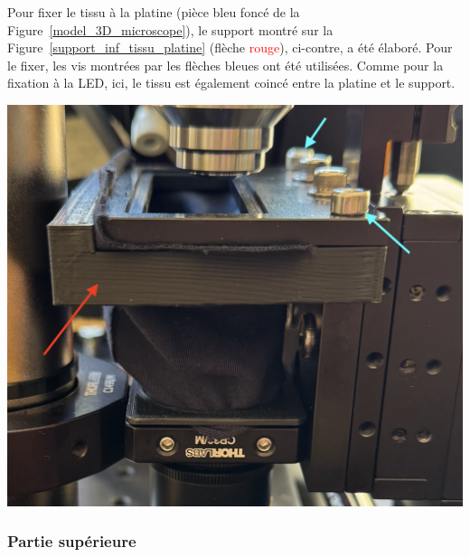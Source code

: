 \begin{minipage}[c]{0.38\textwidth}
    Pour fixer le tissu à la platine (pièce \textcolor[RGB]{30, 50, 150}{bleu foncé} de la Figure~\ref{model_3D_microscope}), le support montré sur la Figure~\ref{support_inf_tissu_platine} (flèche \textcolor{red}{rouge}), ci-contre, a été élaboré. Pour le fixer, les vis montrées par les flèches \textcolor[RGB]{115, 210, 210}{bleues} ont été utilisées. Comme pour la fixation à la LED, ici, le tissu est également coincé entre la platine et le support.
\end{minipage}\hfill
\begin{minipage}[c]{0.58\textwidth}
    \begin{center}
        \includegraphics[width=\textwidth]{assets/figures/Protections_laser/Securite_mecanique/Protection_vers_microscope/support_inf_tissu_platine.jpeg}
    \end{center}
    \label{support_inf_tissu_platine}
\end{minipage}

\subsubsection{Partie supérieure}
